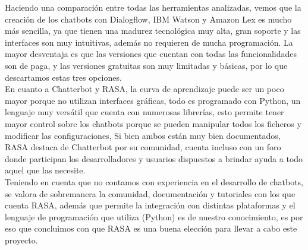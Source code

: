 \indent Haciendo una comparación entre todas las herramientas analizadas, vemos que la creación de los chatbots con Dialogflow, IBM Watson y Amazon Lex es mucho más sencilla, ya que tienen una madurez tecnológica muy alta, gran soporte y las interfaces son muy intuitivas, además no requieren de mucha programación. La mayor desventaja es que las versiones que cuentan con todas las funcionalidades son de paga, y las versiones gratuitas son muy limitadas y básicas, por lo que descartamos estas tres opciones.\\
\indent En cuanto a Chatterbot y RASA, la curva de aprendizaje puede ser un poco mayor porque no utilizan interfaces gráficas, todo es programado con Python, un lenguaje muy versátil que cuenta con numerosas librerías, esto permite tener mayor control sobre los chatbots porque se pueden manipular todos los ficheros y modificar las configuraciones, Si bien ambos están muy bien documentados, RASA destaca de Chatterbot por su comunidad, cuenta incluso con un foro donde participan los desarrolladores y usuarios dispuestos a brindar ayuda a todo aquel que las necesite.\\
\indent Teniendo en cuenta que no contamos con experiencia en el desarrollo de chatbots, se valora de sobremanera la comunidad, documentación y tutoriales con los que cuenta RASA, además que permite la integración con distintas plataformas y el lenguaje de programación que utiliza (Python) es de nuestro conocimiento, es por eso que concluimos con que RASA es una buena elección para llevar a cabo este proyecto.
